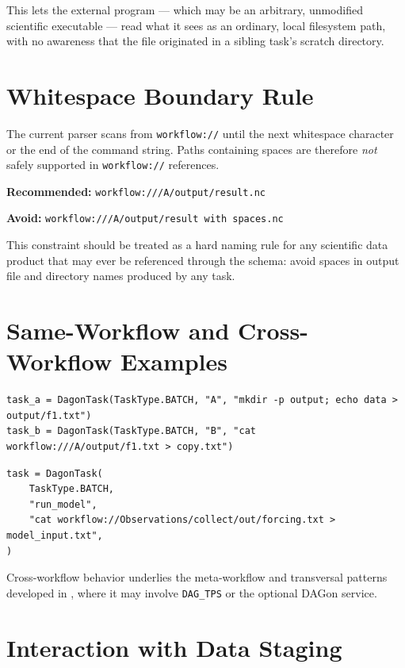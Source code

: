 This lets the external program --- which may be an arbitrary, unmodified
scientific executable --- read what it sees as an ordinary, local filesystem
path, with no awareness that the file originated in a sibling task's scratch
directory.

\section{Whitespace Boundary Rule}
\label{sec:whitespace-rule}

\begin{cautionbox}
The current parser scans from \texttt{workflow://} until the next whitespace
character or the end of the command string. Paths containing spaces are
therefore \emph{not} safely supported in \texttt{workflow://} references.

\textbf{Recommended:} \texttt{workflow:///A/output/result.nc}

\textbf{Avoid:} \texttt{workflow:///A/output/result with spaces.nc}
\end{cautionbox}

This constraint should be treated as a hard naming rule for any scientific
data product that may ever be referenced through the schema: avoid spaces in
output file and directory names produced by any task.

\section{Same-Workflow and Cross-Workflow Examples}

\begin{lstlisting}[caption={Same-workflow producer/consumer pair.}]
task_a = DagonTask(TaskType.BATCH, "A", "mkdir -p output; echo data > output/f1.txt")
task_b = DagonTask(TaskType.BATCH, "B", "cat workflow:///A/output/f1.txt > copy.txt")
\end{lstlisting}

\begin{lstlisting}[caption={Cross-workflow reference, used by meta-workflows.}]
task = DagonTask(
    TaskType.BATCH,
    "run_model",
    "cat workflow://Observations/collect/out/forcing.txt > model_input.txt",
)
\end{lstlisting}

Cross-workflow behavior underlies the meta-workflow and transversal patterns
developed in , where it may involve \texttt{DAG\_TPS} or
the optional DAGon service.

\section{Interaction with Data Staging}

